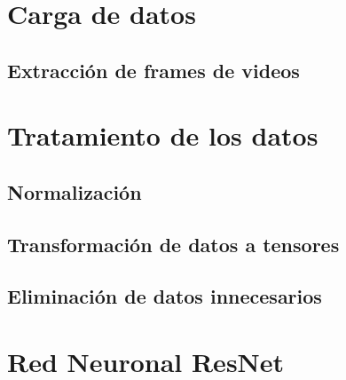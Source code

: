 

\section{Carga de datos}

\subsection{Extracción de frames de videos}


\section{Tratamiento de los datos}

\subsection{Normalización}

\subsection{}

\subsection{Transformación de datos a tensores}

\subsection{}

\subsection{}

\subsection{Eliminación de datos innecesarios}


\section{Red Neuronal ResNet}

